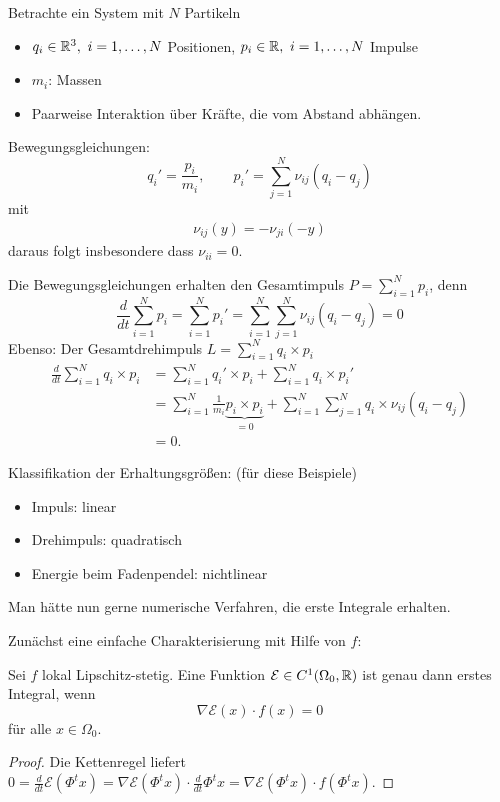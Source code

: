 \begin{bsp}
	Betrachte ein System mit $N$ Partikeln
	\begin{itemize}
		\item $q_i\in\mathbb R^3,\ i=1,\hdots,N$ Positionen, $p_i\in\mathbb R,\ i=1,\hdots,N$ Impulse
		\item $m_i$: Massen
		\item Paarweise Interaktion über Kräfte, die vom Abstand abhängen.
	\end{itemize}
	Bewegungsgleichungen:
	\begin{equation*}
	q_i'=\frac{p_i}{m_i},\qquad p_i' = \sum_{j=1}^N \nu_{ij}(q_i-q_j)
	\end{equation*}
	mit
	\begin{align*}
	\nu_{ij}(y) = - \nu_{ji}(-y)
	\end{align*}
	daraus folgt insbesondere dass $\nu_{ii} = 0$.
	
	Die Bewegungsgleichungen erhalten den Gesamtimpuls $P=\sum_{i=1}^Np_i$, denn
	\begin{equation*}
	\frac{d}{dt}\sum_{i=1}^Np_i = \sum_{i=1}^N p_i' = \sum_{i=1}^N\sum_{j=1}^N\nu_{ij}(q_i-q_j) = 0
	\end{equation*}
	Ebenso: Der Gesamtdrehimpuls $L=\sum_{i=1}^N q_i\times p_i$
	\begin{align*}
		\frac{d}{dt}\sum_{i=1}^N q_i\times p_i
		& = \sum_{i=1}^N q_i'\times p_i+\sum_{i=1}^N q_i\times p_i' \\
		& = \sum_{i=1}^N \frac{1}{m_i}\underbrace{p_i\times p_i}_{=0} + \sum_{i=1}^N\sum_{j=1}^Nq_i\times\nu_{ij}(q_i-q_j) \\
		& = 0.
	\end{align*}
\end{bsp}

Klassifikation der Erhaltungsgrößen: (für diese Beispiele)
\begin{itemize}
 \item Impuls: linear
 \item Drehimpuls: quadratisch
 \item Energie beim Fadenpendel: nichtlinear
\end{itemize}

Man hätte nun gerne numerische Verfahren, die erste Integrale erhalten.

Zunächst eine einfache Charakterisierung mit Hilfe von $f$:

\begin{lemma}
	Sei $f$ lokal Lipschitz-stetig. Eine Funktion $\mathcal E\in C^1(\Omega_0,\mathbb R)$ ist genau dann erstes Integral, wenn
	\begin{equation*}
		\nabla\mathcal E(x)\cdot f(x) = 0
	\end{equation*}
	für alle $x\in\Omega_0$.
\end{lemma}
\begin{proof}
	Die Kettenregel liefert $\displaystyle 0 = \frac{d}{dt} \mathcal E(\Phi^t x) = \nabla\mathcal E(\Phi^tx)\cdot \frac{d}{dt}\Phi^tx = \nabla\mathcal E(\Phi^tx)\cdot f(\Phi^tx)$.
\end{proof}

